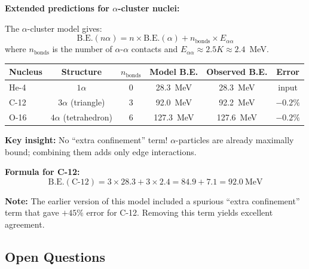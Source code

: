 \textbf{Extended predictions for $\alpha$-cluster nuclei:}

The $\alpha$-cluster model gives:
\[
\text{B.E.}(n\alpha) = n \times \text{B.E.}(\alpha) + n_{\text{bonds}} \times E_{\alpha\alpha}
\]
where $n_{\text{bonds}}$ is the number of $\alpha$-$\alpha$ contacts and $E_{\alpha\alpha} \approx 2.5 K \approx 2.4$~MeV.

\begin{tcolorbox}[colback=green!5!white, colframe=green!75!black, title=$\alpha$-Cluster Model: Corrected Predictions]
\begin{center}
\begin{tabular}{lccccc}
\hline
Nucleus & Structure & $n_{\text{bonds}}$ & Model B.E. & Observed B.E. & Error \\
\hline
He-4 & $1\alpha$ & 0 & 28.3~MeV & 28.3~MeV & input \\
C-12 & $3\alpha$ (triangle) & 3 & 92.0~MeV & 92.2~MeV & $-0.2\%$ \\
O-16 & $4\alpha$ (tetrahedron) & 6 & 127.3~MeV & 127.6~MeV & $-0.2\%$ \\
\hline
\end{tabular}
\end{center}

\textbf{Key insight:} No ``extra confinement'' term! $\alpha$-particles are already maximally bound; combining them adds only edge interactions.

\textbf{Formula for C-12:}
\[
\text{B.E.}(\text{C-12}) = 3 \times 28.3 + 3 \times 2.4 = 84.9 + 7.1 = 92.0~\text{MeV}
\]
\end{tcolorbox}

\textbf{Note:} The earlier version of this model included a spurious ``extra confinement'' term that gave $+45\%$ error for C-12. Removing this term yields excellent agreement.

\subsection{Open Questions}
\label{subsec:m6-open-questions}

